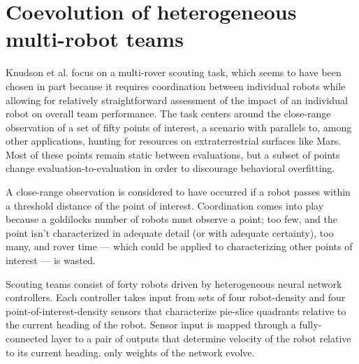 \section{Coevolution of heterogeneous multi-robot teams \cite{knudson2010coevolution}}

Knudson et al. focus on a multi-rover scouting task, which seems to have been chosen in part because it requires coordination between individual robots while allowing for relatively straightforward assessment of the impact of an individual robot on overall team performance.
The task centers around the close-range observation of a set of fifty points of interest, a scenario with parallels to, among other applications, hunting for resources on extraterrestrial surfaces like Mars.
Most of these points remain static between evaluations, but a subset of points change evaluation-to-evaluation in order to discourage behavioral overfitting.

A close-range observation is considered to have occurred if a robot passes within a threshold distance of the point of interest.
Coordination comes into play because a goldilocks number of robots must observe a point; too few, and the point isn't characterized in adequate detail (or with adequate certainty), too many, and rover time --- which could be applied to characterizing other points of interest --- is wasted.

Scouting teams consist of forty robots driven by heterogeneous neural network controllers.
Each controller takes input from sets of four robot-density and four point-of-interest-density sensors that characterize pie-slice quadrants relative to the current heading of the robot.
Sensor input is mapped through a fully-connected layer to a pair of outputs that determine velocity of the robot relative to its current heading.
only weights of the network evolve.

